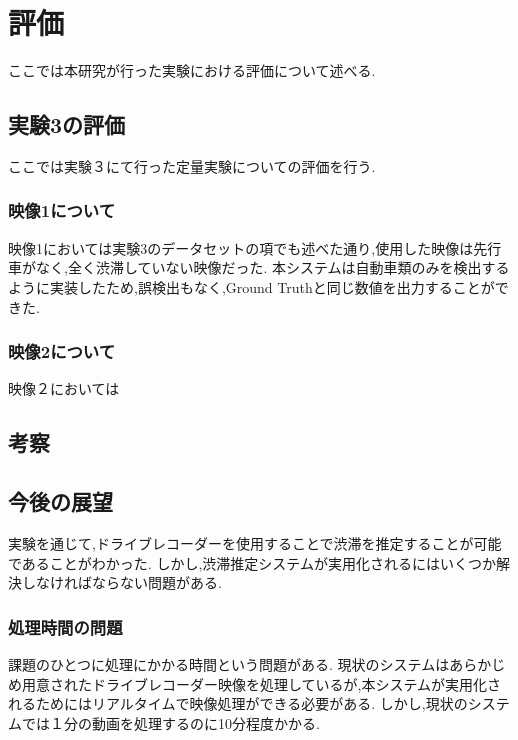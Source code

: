 \chapter{評価}
ここでは本研究が行った実験における評価について述べる.

\section{実験3の評価}
ここでは実験３にて行った定量実験についての評価を行う.

\subsection{映像1について}
映像1においては実験3のデータセットの項でも述べた通り,使用した映像は先行車がなく,全く渋滞していない映像だった.
本システムは自動車類のみを検出するように実装したため,誤検出もなく,Ground Truthと同じ数値を出力することができた.

\subsection{映像2について}
映像２においては

\section{考察}

\section{今後の展望}
実験を通じて,ドライブレコーダーを使用することで渋滞を推定することが可能であることがわかった.
しかし,渋滞推定システムが実用化されるにはいくつか解決しなければならない問題がある.
\subsection{処理時間の問題}
課題のひとつに処理にかかる時間という問題がある.
現状のシステムはあらかじめ用意されたドライブレコーダー映像を処理しているが,本システムが実用化されるためにはリアルタイムで映像処理ができる必要がある.
しかし,現状のシステムでは１分の動画を処理するのに10分程度かかる.

